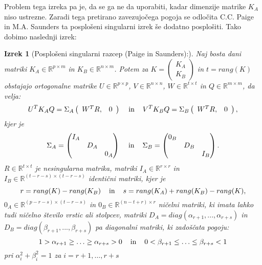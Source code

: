 \documentclass[mat1]{article}
\newtheorem{izrek}{Izrek}
\begin{document}
Problem tega izreka pa je, da se ga ne da uporabiti, kadar dimenzije matrike $K_A$ niso ustrezne. Zaradi tega pretirano zavezujočega pogoja se odločita C.C. Paige in M.A. Saunders ta posplošeni singularni izrek še dodatno posplošiti. Tako dobimo naslednji izrek:
\begin{izrek}[Posplošeni singularni razcep (Paige in Saunders):]
\label{izrek:GSVD} Naj bosta dani matriki $K_A \in \mathbb{R}^{p \times m}$ in $K_B \in \mathbb{R}^{n \times m}$. Potem za $K = \left(\begin{array}{c} K_A \\ K_B \end{array}\right)$ in $t = rang(K)$ obstajajo ortogonalne matrike $U \in \mathbb{R}^{p \times p}$, $V \in \mathbb{R}^{n \times n}$, $W \in \mathbb{R}^{t \times t}$ in $Q \in \mathbb{R}^{m \times m}$, da velja: 
$$U^T K_A Q = \Sigma_A  \left(\begin{array}{cc} W^T R, & 0 \end{array}\right) \hspace{4mm} \text{in} \hspace{4mm} V^T K_B Q = \Sigma_B  \left(\begin{array}{cc} W^T R, & 0 \end{array}\right),$$ kjer je 
$$\Sigma_A = \begin{pmatrix} 
I_A &  & \\
 & D_A & \\
 & & 0_A  
\end{pmatrix} \hspace{4mm} \text{in} \hspace{4mm}
\Sigma_B = \begin{pmatrix} 
0_B &  & \\
 & D_B & \\
 & & I_B  
\end{pmatrix}.$$ 
$R \in \mathbb{R}^{t \times t}$ je nesingularna matrika, matriki $I_A \in \mathbb{R}^{r \times r}$ in $I_B \in \mathbb{R}^{(t-r-s) \times (t-r-s)}$ identični matriki, kjer je 
$$r = rang(K) - rang(K_B) \hspace{4mm} \text{in} \hspace{4mm} s = rang(K_A) + rang(K_B) - rang(K),$$
$0_A \in \mathbb{R}^{(p-r-s) \times (t-r-s)}$ in $0_B \in \mathbb{R}^{(n-t+r) \times r}$ ničelni matriki, ki imata lahko tudi ničelno število vrstic ali stolpcev, matriki
$D_A = diag(\alpha_{r+1},..., \alpha_{r+s})$ in $D_B = diag(\beta_{r+1},..., \beta_{r+s})$ pa diagonalni matriki, ki zadoščata pogoju:
$$1 > \alpha_{r+1} \geq \ldots \geq \alpha_{r+s} > 0 \hspace{4mm} \text{in} \hspace{4mm} 0 < \beta_{r+1} \leq \ldots \leq \beta_{r+s} < 1$$
pri $\alpha_i^2 + \beta_i^2 = 1$ za $ i = r+1,\ldots, r+s$
\end{izrek}
\end{document}
